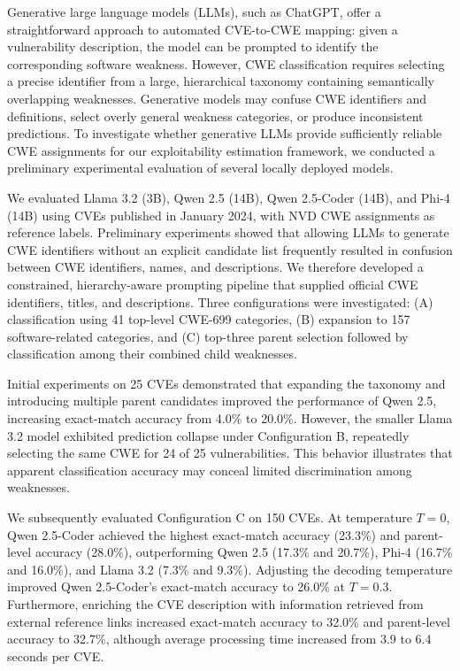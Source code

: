 \documentclass[conference,compsoc]{IEEEtran}
\begin{document}
Generative large language models (LLMs), such as ChatGPT,
offer a straightforward approach to automated CVE-to-CWE
mapping: given a vulnerability description, the model
can be prompted to identify the corresponding software
weakness. However, CWE classification requires selecting
a precise identifier from a large, hierarchical taxonomy
containing semantically overlapping weaknesses.
Generative models may confuse CWE identifiers and
definitions, select overly general weakness categories,
or produce inconsistent predictions. To investigate
whether generative LLMs provide sufficiently reliable
CWE assignments for our exploitability estimation
framework, we conducted a preliminary experimental
evaluation of several locally deployed models.

We evaluated Llama 3.2 (3B), Qwen 2.5 (14B),
Qwen 2.5-Coder (14B), and Phi-4 (14B) using CVEs
published in January 2024, with NVD CWE assignments
as reference labels. Preliminary experiments showed
that allowing LLMs to generate CWE identifiers
without an explicit candidate list frequently
resulted in confusion between CWE identifiers,
names, and descriptions. We therefore developed
a constrained, hierarchy-aware prompting pipeline
that supplied official CWE identifiers, titles,
and descriptions. Three configurations were
investigated: (A) classification using 41 top-level
CWE-699 categories, (B) expansion to 157
software-related categories, and (C) top-three
parent selection followed by classification
among their combined child weaknesses.

Initial experiments on 25 CVEs demonstrated that
expanding the taxonomy and introducing multiple
parent candidates improved the performance of
Qwen 2.5, increasing exact-match accuracy from
4.0\% to 20.0\%. However, the smaller Llama 3.2
model exhibited prediction collapse under
Configuration B, repeatedly selecting the same
CWE for 24 of 25 vulnerabilities. This behavior
illustrates that apparent classification accuracy
may conceal limited discrimination among weaknesses.

We subsequently evaluated Configuration C on
150 CVEs. At temperature $T=0$, Qwen 2.5-Coder
achieved the highest exact-match accuracy (23.3\%)
and parent-level accuracy (28.0\%), outperforming
Qwen 2.5 (17.3\% and 20.7\%), Phi-4 (16.7\%
and 16.0\%), and Llama 3.2 (7.3\% and 9.3\%).
Adjusting the decoding temperature improved
Qwen 2.5-Coder's exact-match accuracy to 26.0\%
at $T=0.3$. Furthermore, enriching the CVE
description with information retrieved from
external reference links increased exact-match
accuracy to 32.0\% and parent-level accuracy
to 32.7\%, although average processing time
increased from 3.9 to 6.4 seconds per CVE.
\end{document}
